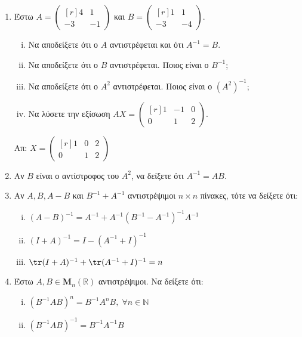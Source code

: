 \documentclass[a4paper,table]{report}
\begin{document}
\begin{enumerate}
  
  \item Έστω $ A = 
    \begin{pmatrix*}[r]
      4 & 1 \\
      -3 & -1
    \end{pmatrix*} $ και $ B = 
    \begin{pmatrix*}[r]
      1 & 1 \\
      -3 & -4
    \end{pmatrix*}$. 
    \begin{enumerate}[i)]
      \item Να αποδείξετε ότι ο $A$ αντιστρέφεται και ότι $ A^{-1} = B $.
      \item Να αποδείξετε ότι ο $ B $ αντιστρέφεται. Ποιος είναι ο $ B^{-1} $;
      \item Να αποδείξετε ότι ο $ A^{2} $ αντιστρέφεται. Ποιος είναι ο $ (A^{2})^{-1} $;
      \item Να λύσετε την εξίσωση $ AX= 
        \begin{pmatrix*}[r]
          1 & -1 & 0 \\
          0 & 1 & 2
        \end{pmatrix*} $.
    \end{enumerate}

    \hfill Απ: $ X= 
    \begin{pmatrix*}[r]
      1 & 0 & 2 \\
      0 & 1 & 2
    \end{pmatrix*} $ 

  \item Αν $B$ είναι ο αντίστροφος του $ A^{2} $, να δείξετε ότι $ A^{-1}=AB $.

  \item Αν $ A,B,A-B $ και $ B^{-1}+A^{-1} $ αντιστρέψιμοι 
    $ n \times n $ πίνακες, τότε να δείξετε ότι:
    \begin{enumerate}[i)]
      \item $ (A-B)^{-1} = A^{-1}+A^{-1}(B^{-1}-A^{-1})^{-1}A^{-1} $
      \item $ (I+A)^{-1} = I-(A^{-1}+I)^{-1} $
      \item $\tr(I+A)^{-1} + \tr(A^{-1}+I)^{-1} = n $
    \end{enumerate}
    
  \item Έστω $ A, B \in \textbf{M}_{n}(\mathbb{R}) $ αντιστρέψιμοι. Να δείξετε ότι:
    \begin{enumerate}[i)]
      \item $ (B^{-1}AB)^{n} = B^{-1}A^{n}B, \; \forall n \in \mathbb{N} $
      \item $ (B^{-1}AB)^{-1} = B^{-1}A^{-1}B $
    \end{enumerate}


\end{enumerate}
\end{document}
